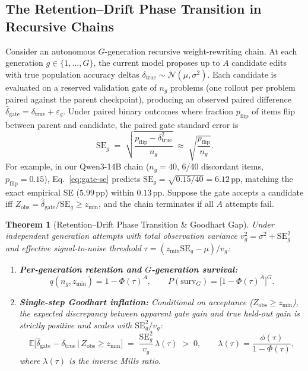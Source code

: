 \documentclass[10pt]{article}
\newtheorem{theorem}{Theorem}
\begin{document}
\subsection{The Retention--Drift Phase Transition in Recursive Chains}
\label{sec:phase}

Consider an autonomous $G$-generation recursive weight-rewriting chain. At each generation $g \in \{1,\dots,G\}$, the current model proposes up to $A$ candidate edits with true population accuracy deltas $\delta_{\mathrm{true}} \sim \mathcal{N}(\mu, \sigma^2)$. Each candidate is evaluated on a reserved validation gate of $n_g$ problems (one rollout per problem paired against the parent checkpoint), producing an observed paired difference $\hat{\delta}_{\mathrm{gate}} = \delta_{\mathrm{true}} + \varepsilon_g$. Under paired binary outcomes where fraction $p_{\mathrm{flip}}$ of items flip between parent and candidate, the paired gate standard error is
\begin{equation}
\label{eq:gate-se}
\mathrm{SE}_g \;=\; \sqrt{\frac{p_{\mathrm{flip}} - \delta_{\mathrm{true}}^2}{n_g}} \;\approx\; \sqrt{\frac{p_{\mathrm{flip}}}{n_g}}.
\end{equation}
For example, in our Qwen3-14B chain ($n_g=40$, 6/40 discordant items, $p_{\mathrm{flip}}=0.15$), Eq.~\eqref{eq:gate-se} predicts $\mathrm{SE}_g = \sqrt{0.15/40} = 6.12$\,pp, matching the exact empirical SE ($5.99$\,pp) within $0.13$\,pp. Suppose the gate accepts a candidate iff $Z_{\mathrm{obs}} = \hat{\delta}_{\mathrm{gate}} / \mathrm{SE}_g \ge z_{\min}$, and the chain terminates if all $A$ attempts fail.

\begin{theorem}[Retention--Drift Phase Transition \& Goodhart Gap]
\label{thm:phase}
Under independent generation attempts with total observation variance $v_g^2 = \sigma^2 + \mathrm{SE}_g^2$ and effective signal-to-noise threshold $\tau = (z_{\min}\mathrm{SE}_g - \mu)/v_g$:
\begin{enumerate}[leftmargin=1.4em,itemsep=1pt,topsep=2pt]
    \item \textbf{Per-generation retention and $G$-generation survival:}
    \begin{equation}
    \label{eq:surv}
    q(n_g, z_{\min}) = 1 - \Phi(\tau)^A, \qquad P(\mathrm{surv}_G) = \bigl[1 - \Phi(\tau)^A\bigr]^G.
    \end{equation}
    \item \textbf{Single-step Goodhart inflation:} Conditional on acceptance ($Z_{\mathrm{obs}}\ge z_{\min}$), the expected discrepancy between apparent gate gain and true held-out gain is strictly positive and scales with $\mathrm{SE}_g^2 / v_g$:
    \begin{equation}
    \label{eq:goodhart}
    \mathbb{E}\bigl[\hat{\delta}_{\mathrm{gate}} - \delta_{\mathrm{true}} \,\big|\, Z_{\mathrm{obs}} \ge z_{\min}\bigr] \;=\; \frac{\mathrm{SE}_g^2}{v_g}\,\lambda(\tau) \;>\; 0, \qquad \lambda(\tau) = \frac{\phi(\tau)}{1 - \Phi(\tau)},
    \end{equation}
    where $\lambda(\tau)$ is the inverse Mills ratio.
\end{enumerate}
\end{theorem}
\end{document}

